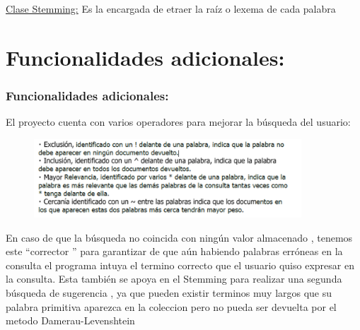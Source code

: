 \begin{frame}
    \begin{block}{\underline{Clase Stemming:}}
        Es la encargada de etraer la raíz o lexema de cada palabra 
    
    \end{block}
\end{frame}

\section*{Funcionalidades adicionales:}

\begin{frame}
    \frametitle{Funcionalidades adicionales:}
    \begin{block}{\color{red}El proyecto cuenta con varios operadores para mejorar la búsqueda del usuario:}
    \begin{figure}
        \includegraphics[width=100mm]{Imagen10.png}
    \end{figure}
    \end{block}
    
    \begin{block}{\color{orange}{Sugerencia para corregir la búsqueda del usuario:}}
    En caso de que la búsqueda no coincida con ningún valor almacenado , tenemos este “corrector ” para garantizar de que aún habiendo palabras erróneas  en la consulta el programa intuya el termino correcto que el usuario quiso expresar en la consulta. 
 \color{red}Esta también se apoya en el Stemming para realizar una segunda búsqueda de sugerencia , ya que pueden existir terminos muy largos que su palabra primitiva aparezca en la coleccion pero no pueda ser devuelta por el metodo Damerau-Levenshtein
\end{block}

\end{frame}

